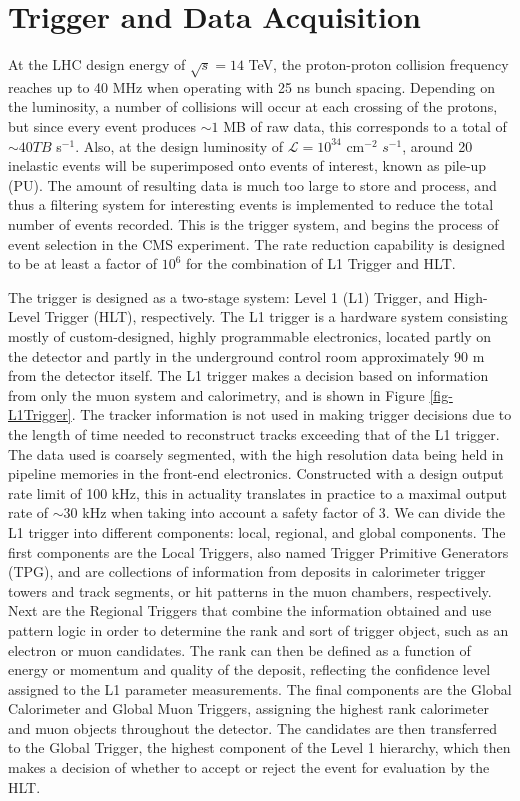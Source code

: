 \section{Trigger and Data Acquisition} \label{sec-Trigger}

At the LHC design energy of $\sqrt{s}=14$ TeV, the proton-proton collision frequency reaches up to 40 MHz when operating with 25 ns bunch spacing. Depending on the luminosity, a number of collisions will occur at each crossing of the protons, but since every event produces $\sim1$ MB of raw data, this corresponds to a total of $\sim 40 TB$ s$^{-1}$. Also, at the design luminosity of $\mathcal{L} = 10^{34}$ cm$^{-2}$ $s^{-1}$, around 20 inelastic events will be superimposed onto events of interest, known as pile-up (PU). The amount of resulting data is much too large to store and process, and thus a filtering system for interesting events is implemented to reduce the total number of events recorded. This is the trigger system, and begins the process of event selection in the CMS experiment. The rate reduction capability is designed to be at least a factor of $10^6$ for the combination of L1 Trigger and HLT.

The trigger is designed as a two-stage system: Level 1 (L1) Trigger, and High-Level Trigger (HLT), respectively. The L1 trigger is a hardware system consisting mostly of custom-designed, highly programmable electronics, located partly on the detector and partly in the underground control room approximately 90 m from the detector itself. The L1 trigger makes a decision based on information from only the muon system and calorimetry, and is shown in Figure \ref{fig-L1Trigger}. The tracker information is not used in making trigger decisions due to the length of time needed to reconstruct tracks exceeding that of the L1 trigger. The data used is coarsely segmented, with the high resolution data being held in pipeline memories in the front-end electronics. Constructed with a design output rate limit of 100 kHz, this in actuality translates in practice to a maximal output rate of $\sim30$ kHz when taking into account a safety factor of 3. We can divide the L1 trigger into different components: local, regional, and global components. The first components are the Local Triggers, also named Trigger Primitive Generators (TPG), and are collections of information from deposits in calorimeter trigger towers and track segments, or hit patterns in the muon chambers, respectively. Next are the Regional Triggers that combine the information obtained and use pattern logic in order to determine the rank and sort of trigger object, such as an electron or muon candidates. The rank can then be defined as a function of energy or momentum and quality of the deposit, reflecting the confidence level assigned to the L1 parameter measurements. The final components are the Global Calorimeter and Global Muon Triggers, assigning the highest rank calorimeter and muon objects throughout the detector. The candidates are then transferred to the Global Trigger, the highest component of the Level 1 hierarchy, which then makes a decision of whether to accept or reject the event for evaluation by the HLT. 


